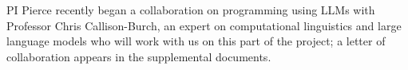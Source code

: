 
PI Pierce recently began a collaboration on programming using LLMs
with Professor Chris Callison-Burch, an expert on computational
linguistics and large language models who will work with us on this
part of the project; a letter of collaboration appears in the
supplemental documents.


